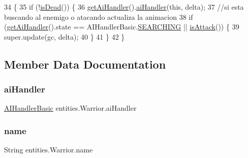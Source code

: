 \begin{DoxyCode}
34                                                      \{
35         \textcolor{keywordflow}{if} (!\mbox{\hyperlink{classentities_1_1_subject_a970082c9d187619c1a27dceec8b3b908}{isDead}}()) \{
36             \mbox{\hyperlink{classentities_1_1_warrior_a20baa7b8b0b22cb20f4dc996e6a0b43e}{getAiHandler}}().\mbox{\hyperlink{classentities_1_1_a_i_handler_basic_ae69789cadb89030804ac4ea2d1971e21}{aiHandler}}(\textcolor{keyword}{this}, delta);
37             \textcolor{comment}{//si esta buscando al enemigo o atacando actualiza la animacion}
38             \textcolor{keywordflow}{if} (\mbox{\hyperlink{classentities_1_1_warrior_a20baa7b8b0b22cb20f4dc996e6a0b43e}{getAiHandler}}().state == AIHandlerBasic.\mbox{\hyperlink{classentities_1_1_a_i_handler_basic_ac538f98b8bf642899b6cfe493258f381}{SEARCHING}} || 
      \mbox{\hyperlink{classentities_1_1_subject_a6c4ff8d1e50168c7738c8b39cec72631}{isAttack}}()) \{
39                 super.update(gc, delta);
40             \}
41         \}
42     \}
\end{DoxyCode}


\subsection{Member Data Documentation}
\mbox{\label{classentities_1_1_warrior_a5192a845694a855efc603e4e89d6df38}} 
\subsubsection{\texorpdfstring{ai\+Handler}{aiHandler}}
{\footnotesize\ttfamily \mbox{\hyperlink{classentities_1_1_a_i_handler_basic}{A\+I\+Handler\+Basic}} entities.\+Warrior.\+ai\+Handler\hspace{0.3cm}{\ttfamily [private]}}

\mbox{\label{classentities_1_1_warrior_a1fab32d35334023bc7cd4866841e817b}} 
\subsubsection{\texorpdfstring{name}{name}}
{\footnotesize\ttfamily String entities.\+Warrior.\+name\hspace{0.3cm}{\ttfamily [private]}}

